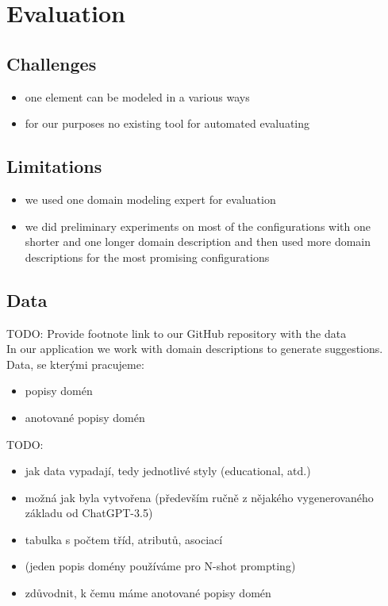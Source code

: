 \chapter{Evaluation}

\section{Challenges}
\begin{itemize}
\item one element can be modeled in a various ways
\item for our purposes no existing tool for automated evaluating
\end{itemize}


\section{Limitations}
\begin{itemize}
\item we used one domain modeling expert for evaluation
\item we did preliminary experiments on most of the configurations with one shorter and one longer domain description and then used more domain descriptions for the most promising configurations
\end{itemize}


\section{Data}

TODO: Provide footnote link to our GitHub repository with the data \\

In our application we work with domain descriptions to generate suggestions. \\

Data, se kterými pracujeme:
\begin{itemize}
\item popisy domén
\item anotované popisy domén \\
\end{itemize}

TODO:
\begin{itemize}
\item jak data vypadají, tedy jednotlivé styly (educational, atd.)
\item možná jak byla vytvořena (především ručně z nějakého vygenerovaného základu od ChatGPT-3.5)
\item tabulka s počtem tříd, atributů, asociací
\item (jeden popis domény používáme pro N-shot prompting)
\item zdůvodnit, k čemu máme anotované popisy domén
\end{itemize}


